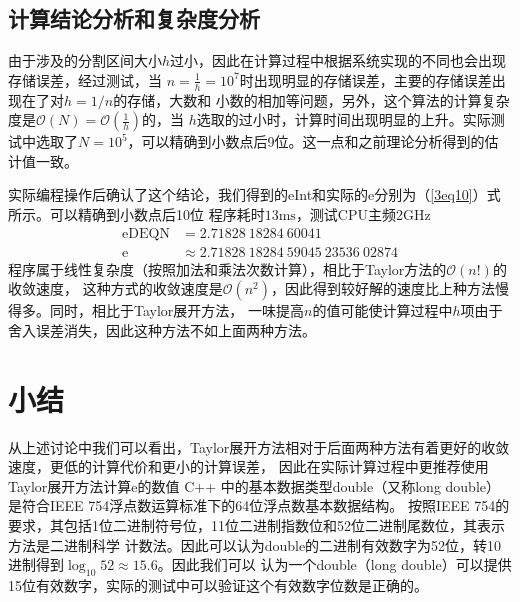 \documentclass[onecolumn,compsoc]{IEEEtran}
\renewcommand{\|}{\Bigg |}
\newcommand{\e}{\mathrm{e}}
\begin{document}
\subsection{计算结论分析和复杂度分析}
由于涉及的分割区间大小$h$过小，因此在计算过程中根据系统实现的不同也会出现存储误差，经过测试，当
$n = \frac{1}{h} = 10^7$时出现明显的存储误差，主要的存储误差出现在了对$h = 1/n$的存储，大数和
小数的相加等问题，另外，这个算法的计算复杂度是$\mathcal O(N) = \mathcal O(\frac{1}{h})$的，当
$h$选取的过小时，计算时间出现明显的上升。实际测试中选取了$N = 10^5$，可以精确到小数点后9位。这一点和之前理论分析得到的估计值一致。

实际编程操作后确认了这个结论，我们得到的eInt和实际的e分别为（\ref{3eq10}）式所示。可以精确到小数点后10位
程序耗时$13\mathrm{ms}$，测试CPU主频2GHz
\begin{equation}\label{3eq10}\begin{aligned}
\mathrm{eDEQN} &= 2.71828\ 18284\ 60041 \\ 
\e &\approx 2.71828\ 18284\ 59045\ 23536\ 02874 
\end{aligned}\end{equation}
程序属于线性复杂度（按照加法和乘法次数计算），相比于Taylor方法的$\mathcal{O}(n!)$的收敛速度，
这种方式的收敛速度是$\mathcal{O}(n^2)$，因此得到较好解的速度比上种方法慢得多。同时，相比于Taylor展开方法，
一味提高$n$的值可能使计算过程中$h$项由于舍入误差消失，因此这种方法不如上面两种方法。
\section{小结}
从上述讨论中我们可以看出，Taylor展开方法相对于后面两种方法有着更好的收敛速度，更低的计算代价和更小的计算误差，
因此在实际计算过程中更推荐使用Taylor展开方法计算e的数值
\appendix[C++ 标准中double的存储方式和有效值]
C++ 中的基本数据类型double（又称long double）是符合IEEE 754浮点数运算标准下的64位浮点数基本数据结构。
按照IEEE 754的要求，其包括1位二进制符号位，11位二进制指数位和52位二进制尾数位，其表示方法是二进制科学
计数法。因此可以认为double的二进制有效数字为52位，转10进制得到$\log_{10}52 \approx 15.6$。因此我们可以
认为一个double（long double）可以提供15位有效数字，实际的测试中可以验证这个有效数字位数是正确的。
\end{document}
